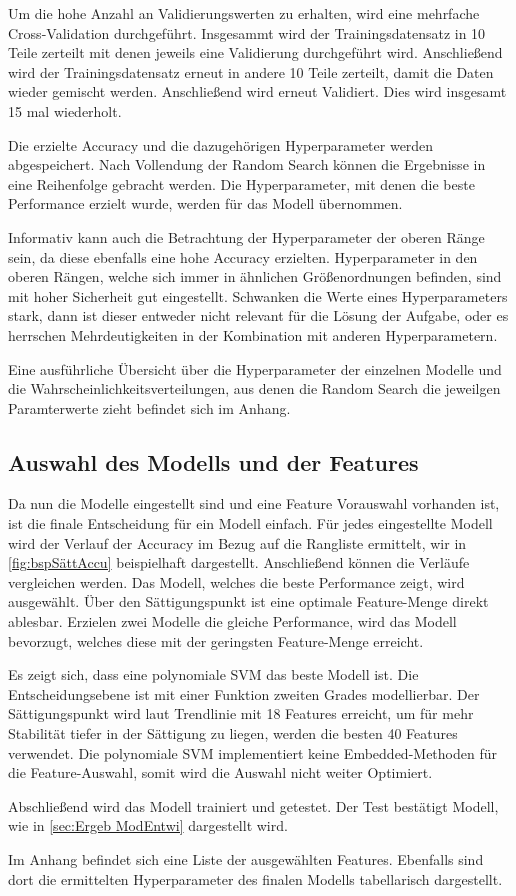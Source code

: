Um die hohe Anzahl an Validierungswerten zu erhalten, wird eine mehrfache Cross-Validation durchgeführt. Insgesammt wird der Trainingsdatensatz in 10 Teile zerteilt mit denen jeweils eine Validierung durchgeführt wird. Anschließend wird der Trainingsdatensatz erneut in andere 10 Teile zerteilt, damit die Daten wieder gemischt werden. Anschließend wird erneut Validiert. Dies wird insgesamt 15 mal wiederholt. \par

Die erzielte Accuracy und die dazugehörigen Hyperparameter werden abgespeichert. Nach Vollendung der Random Search können die Ergebnisse in eine Reihenfolge gebracht werden. Die Hyperparameter, mit denen die beste Performance erzielt wurde, werden für das Modell übernommen. \par

Informativ kann auch die Betrachtung der Hyperparameter der oberen Ränge sein, da diese ebenfalls eine hohe Accuracy erzielten. Hyperparameter in den oberen Rängen, welche sich immer in ähnlichen Größenordnungen befinden, sind mit hoher Sicherheit gut eingestellt. Schwanken die Werte eines Hyperparameters stark, dann ist dieser entweder nicht relevant für die Lösung der Aufgabe, oder es herrschen Mehrdeutigkeiten in der Kombination mit anderen Hyperparametern. \par

Eine ausführliche Übersicht über die Hyperparameter der einzelnen Modelle und die Wahrscheinlichkeitsverteilungen, aus denen die Random Search die jeweilgen Paramterwerte zieht befindet sich im Anhang. 

\subsection{Auswahl des Modells und der Features}\label{sec:Meth ModelSele}
Da nun die Modelle eingestellt sind und eine Feature Vorauswahl vorhanden ist, ist die finale Entscheidung für ein Modell einfach. Für jedes eingestellte Modell wird der Verlauf der Accuracy im Bezug auf die Rangliste ermittelt, wir in \ref{fig:bspSättAccu} beispielhaft dargestellt. Anschließend können die Verläufe vergleichen werden. Das Modell, welches die beste Performance zeigt, wird ausgewählt. Über den Sättigungspunkt ist eine optimale Feature-Menge direkt ablesbar. Erzielen zwei Modelle die gleiche Performance, wird das Modell bevorzugt, welches diese mit der geringsten Feature-Menge erreicht. \par

Es zeigt sich, dass eine polynomiale SVM das beste Modell ist. Die Entscheidungsebene ist mit einer Funktion zweiten Grades modellierbar. Der Sättigungspunkt wird laut Trendlinie mit 18 Features erreicht, um für mehr Stabilität tiefer in der Sättigung zu liegen, werden die besten 40 Features verwendet. Die polynomiale SVM implementiert keine Embedded-Methoden für die Feature-Auswahl, somit wird die Auswahl nicht weiter Optimiert. \par

Abschließend wird das Modell trainiert und getestet. Der Test bestätigt Modell, wie in \ref{sec:Ergeb ModEntwi} dargestellt wird.\par

Im Anhang befindet sich eine Liste der ausgewählten Features. Ebenfalls sind dort die ermittelten Hyperparameter des finalen Modells tabellarisch dargestellt.